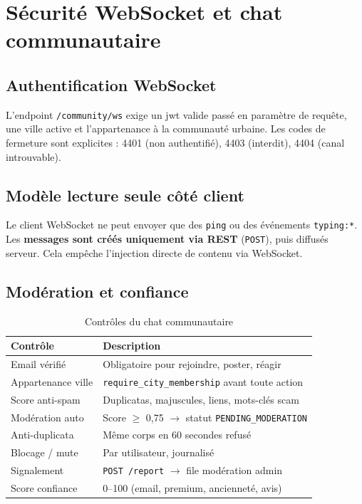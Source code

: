 \section{Sécurité WebSocket et chat communautaire}

\subsection{Authentification WebSocket}

L'endpoint \texttt{/community/ws} exige un \gls{jwt} valide passé en paramètre de requête, une ville active et l'appartenance à la communauté urbaine. Les codes de fermeture sont explicites : 4401 (non authentifié), 4403 (interdit), 4404 (canal introuvable).

\subsection{Modèle lecture seule côté client}

Le client WebSocket ne peut envoyer que des \texttt{ping} ou des événements \texttt{typing:*}. Les \textbf{messages sont créés uniquement via REST} (\texttt{POST}), puis diffusés serveur. Cela empêche l'injection directe de contenu via WebSocket.

\subsection{Modération et confiance}

\begin{table}[H]
  \centering
  \caption{Contrôles du chat communautaire}
  \label{tab:community-controls}
  \begin{tabularx}{\textwidth}{@{}lX@{}}
    \toprule
    \textbf{Contrôle} & \textbf{Description} \\
    \midrule
    Email vérifié & Obligatoire pour rejoindre, poster, réagir \\
    Appartenance ville & \texttt{require\_city\_membership} avant toute action \\
    Score anti-spam & Duplicatas, majuscules, liens, mots-clés scam \\
    Modération auto & Score $\geq$ 0,75 $\rightarrow$ statut \texttt{PENDING\_MODERATION} \\
    Anti-duplicata & Même corps en 60 secondes refusé \\
    Blocage / mute & Par utilisateur, journalisé \\
    Signalement & \texttt{POST /report} $\rightarrow$ file modération admin \\
    Score confiance & 0--100 (email, premium, ancienneté, avis) \\
    \bottomrule
  \end{tabularx}
\end{table}

